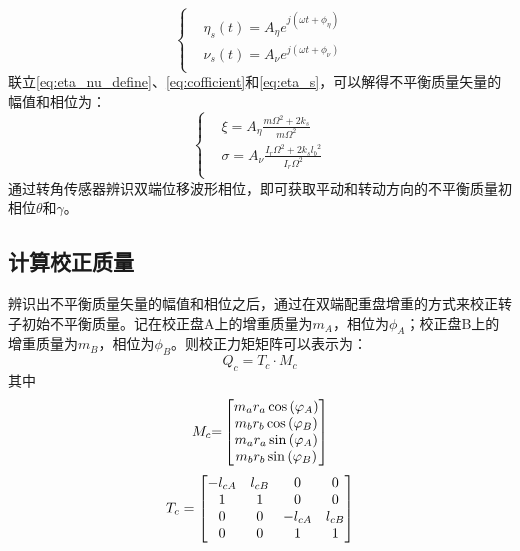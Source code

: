 \documentclass[
  lang=cn,
  degree=master,
  openany,oneside
]{nuaathesis}
\begin{document}
\begin{equation}
\label{eq:eta_s}
\left\{
\begin{aligned}
& \eta _s (t) = A_{\eta}e^{j(\omega t + \phi _{\eta})} \\
& \nu _s (t) = A_{\nu}e^{j(\omega t + \phi _{\nu})} \\
\end{aligned}
\right.
\end{equation}
联立\autoref{eq:eta_nu_define}、\autoref{eq:cofficient}和\autoref{eq:eta_s}，可以解得不平衡质量矢量的幅值和相位为：
\begin{equation}
\left\{
\begin{aligned}
& \xi = A_{\eta}\frac{m{\Omega}^2 + 2k_s}{m{\Omega}^2}\\
& \sigma = A_{\nu}\frac{I_r{\Omega}^2 + 2k_s{l_b}^2}{I_r{\Omega}^2}\\
\end{aligned}
\right.
\end{equation}
通过转角传感器辨识双端位移波形相位，即可获取平动和转动方向的不平衡质量初相位$\theta$和$\gamma$。
\subsection{计算校正质量}
辨识出不平衡质量矢量的幅值和相位之后，通过在双端配重盘增重的方式来校正转子初始不平衡质量。记在校正盘A上的增重质量为$m_A$，相位为$\phi _A$；校正盘B上的增重质量为$m_B$，相位为$\phi _B$。则校正力矩矩阵可以表示为：
\begin{equation}
Q_c = T_c \cdot M_c
\end{equation}
其中
\begin{equation}
{M_c}{\rm{ = }}\left[ {\begin{matrix}
   {{m_a}{r_a}\cos \left( {{\varphi _A}} \right)}  \cr 
   {{m_b}{r_b}\cos \left( {{\varphi _B}} \right)}  \cr 
   {{m_a}{r_a}\sin \left( {{\varphi _A}} \right)}  \cr 
   {{m_b}{r_b}\sin \left( {{\varphi _B}} \right)}  \cr 

 \end{matrix} } \right]
\end{equation}
\begin{equation}
{T_c} = \left[ {\begin{matrix}
   { - {l_{cA}}} & {{l_{cB}}} & 0 & 0  \cr 
   1 & 1 & 0 & 0  \cr 
   0 & 0 & { - {l_{cA}}} & {{l_{cB}}}  \cr 
   0 & 0 & 1 & 1  \cr 

 \end{matrix} } \right]
\end{equation}
\end{document}
